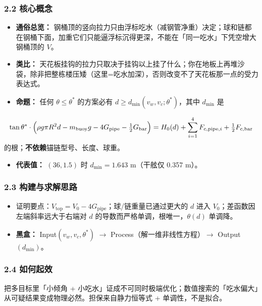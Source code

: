 \documentclass[UTF8,a4paper,zihao=-4]{ctexart}
\begin{document}
\subsubsection{\texorpdfstring{2.2 核心概念}{2.2 核心概念}}
\begin{itemize}[leftmargin=1.5em]
\item \textbf{通俗总览：} 钢桶顶的竖向拉力只由浮标吃水（减钢管净重）决定；球和链都在钢桶下面，加重它们只能逼浮标沉得更深，不能在「同一吃水」下凭空增大钢桶顶的 \(V\)。
\item \textbf{类比：} 天花板挂钩的拉力只取决于挂钩以上挂了什么；你在地板上再堆沙袋，除非把整栋楼压矮（这里=吃水加深），否则改变不了天花板那一点的受力表达式。
\item \textbf{命题：} 任何 \(\theta\le\theta^*\) 的方案必有 \(d\ge d_{\min}(v_w,v_c;\theta^*)\)，其中 \(d_{\min}\) 是
\end{itemize}
  \[
  \tan\theta^*\cdot\Bigl(\rho g\pi R^2d-m_{\mathrm{buoy}}g-4G_{\mathrm{pipe}}-\tfrac12 G_{\mathrm{bar}}\Bigr)
  =H_0(d)+\sum_{i=1}^{4}F_{c,\mathrm{pipe},i}+\tfrac12F_{c,\mathrm{bar}}
  \]
  的根；\textbf{不依赖}锚链型号、长度、球重。
\begin{itemize}[leftmargin=1.5em]
\item \textbf{代表值：} \((36,1.5)\) 时 \(d_{\min}=1.643\) m（干舷仅 0.357 m）。
\end{itemize}

\subsubsection{\texorpdfstring{2.3 构建与求解思路}{2.3 构建与求解思路}}
\begin{itemize}[leftmargin=1.5em]
\item 证明要点：\(V_{\mathrm{top}}=V_0-4G_{\mathrm{pipe}}\)；球/链重量已通过更大的 \(d\) 进入 \(V_0\)；差函数因左端斜率远大于右端对 \(d\) 的导数而严格单调，根唯一，\(\theta(d)\) 单调降。
\item \textbf{黑盒：} Input\((v_w,v_c,\theta^*)\) $\rightarrow$ Process（解一维非线性方程）$\rightarrow$ Output\((d_{\min})\)。
\end{itemize}

\subsubsection{\texorpdfstring{2.4 如何起效}{2.4 如何起效}}
把多目标里「小倾角 + 小吃水」证成不可同时极端优化；数值搜索的「吃水偏大」从可疑结果变成物理必然。担保来自静力恒等式 + 单调性，不是拟合。
\end{document}
